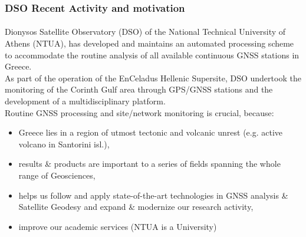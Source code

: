\begin{frame}\frametitle{DSO Recent Activity and motivation}\framesubtitle{}\label{}
\vskip-1.5cm
  Dionysos Satellite Observatory (DSO) of the National Technical University of 
  Athens (NTUA), has developed and maintains an automated processing
  scheme to accommodate the routine analysis of all available continuous GNSS 
  stations in Greece.
  \\
 As part of the operation of the EnCeladus Hellenic Supersite,
DSO undertook the monitoring of the Corinth Gulf area through
GPS/GNSS stations and the development of a multidisciplinary
platform.
  \\
  Routine GNSS processing and site/network monitoring is crucial, because:
\begin{itemize}\setlength\itemsep{1em}
  \item Greece lies in a region of utmost tectonic and volcanic unrest (e.g. 
      active volcano in Santorini isl.),
  \item results \& products are important to a series of fields spanning 
      the whole range of Geosciences,
  \item helps us follow and apply state-of-the-art technologies in GNSS analysis 
      \& Satellite Geodesy and expand \& modernize our research activity,
  \item improve our academic services (NTUA is a University)
\end{itemize}


\end{frame}
%

